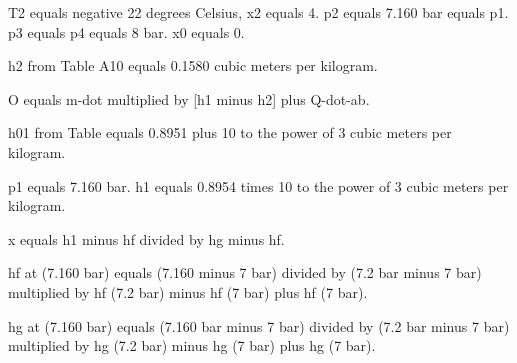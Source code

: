 T2 equals negative 22 degrees Celsius, x2 equals 4.  
p2 equals 7.160 bar equals p1.  
p3 equals p4 equals 8 bar.  
x0 equals 0.  

h2 from Table A10 equals 0.1580 cubic meters per kilogram.  

O equals m-dot multiplied by [h1 minus h2] plus Q-dot-ab.  

h01 from Table equals 0.8951 plus 10 to the power of 3 cubic meters per kilogram.  

p1 equals 7.160 bar.  
h1 equals 0.8954 times 10 to the power of 3 cubic meters per kilogram.  

x equals h1 minus hf divided by hg minus hf.  

hf at (7.160 bar) equals (7.160 minus 7 bar) divided by (7.2 bar minus 7 bar) multiplied by hf (7.2 bar) minus hf (7 bar) plus hf (7 bar).  

hg at (7.160 bar) equals (7.160 bar minus 7 bar) divided by (7.2 bar minus 7 bar) multiplied by hg (7.2 bar) minus hg (7 bar) plus hg (7 bar).